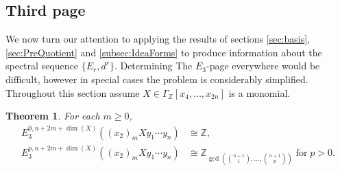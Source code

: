 \documentclass{article}
\theoremstyle{plain}
\newtheorem{thm}{Theorem}[section]
\theoremstyle{definition}
\numberwithin{thm}{section}
\begin{document}
		\subsection{Third page}\label{sec:Third}
			
			We now turn our attention to applying the results of sections \ref{sec:basis}, \ref{sec:PreQuotient}
			and  \ref{subsec:IdeaForms}
			to produce information about the spectral sequence $\{ E_r,d^r \}$. 
			Determining The $E_3$-page everywhere would be difficult, however in special cases the problem is considerably simplified.
			Throughout this section assume $X\in \Gamma_{\mathbb{Z}}[x_4,\dots,x_{2n}]$ is a monomial.
			
			\begin{thm}\label{thm:BottemRow}
				For each $m\geq 0$,
				\begin{align*}
					E_3^{0,n+2m+\dim(X)}((x_2)_m X y_1\cdots y_n)&\cong\mathbb{Z}, \\
					E_3^{p,n+2m+\dim(X)}((x_2)_{m}X y_1\cdots y_n)&\cong\mathbb{Z}_{\gcd(\binom{n+1}{1},\dots,\binom{n+1}{p})} \; \text{for} \; p>0.
				\end{align*}
			\end{thm}
\end{document}
